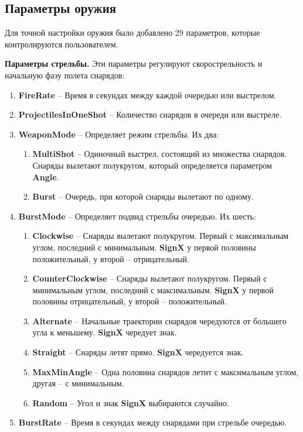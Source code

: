 \subsection{Параметры оружия}
Для точной настройки оружия было добавлено 29 параметров, которые контролируются пользователем.

\vspace{5mm}

\textbf{Параметры стрельбы.} Эти параметры регулируют скорострельность и начальную фазу полета снарядов:
\begin{enumerate}
    \item {\small \textbf{FireRate}} -- Время в секундах между каждой очередью или выстрелом.
    \item {\small \textbf{ProjectilesInOneShot}} -- Количество снарядов в очереди или выстреле.
    \item {\small \textbf{WeaponMode}} -- Определяет режим стрельбы. Их два:
    \begin{enumerate}[label=\textbullet]
        \item {\small \textbf{MultiShot}} -- Одиночный выстрел, состоящий из множества снарядов. Снаряды вылетают полукругом, который определяется параметром {\small \textbf{Angle}}.
        \item {\small \textbf{Burst}} -- Очередь, при которой снаряды вылетают по одному.
    \end{enumerate}
    \item {\small \textbf{BurstMode}} -- Определяет подвид стрельбы очередью. Их шесть:
    \begin{enumerate}[label=\textbullet]
        \item {\small \textbf{Clockwise}} -- Снаряды вылетают полукругом. Первый с максимальным углом, последний с минимальным. {\small \textbf{SignX}} у первой половины положительный, у второй -- отрицательный.
        \item {\small \textbf{CounterClockwise}} -- Снаряды вылетают полукругом. Первый с минимальным углом, последний с максимальным. {\small \textbf{SignX}} у первой половины отрицательный, у второй -- положительный.
        \item {\small \textbf{Alternate}} -- Начальные траектории снарядов чередуются от большего угла к меньшему. {\small \textbf{SignX}} чередует знак.
        \item {\small \textbf{Straight}} -- Снаряды летят прямо. {\small \textbf{SignX}} чередуется знак.
        \item {\small \textbf{MaxMinAngle}} -- Одна половина снарядов летит с максимальным углом, другая -- с минимальным.
        \item {\small \textbf{Random}} -- Угол и знак {\small \textbf{SignX}} выбираются случайно.
    \end{enumerate}
    \item {\small \textbf{BurstRate}} -- Время в секундах между снарядами при стрельбе очередью.
\end{enumerate}

